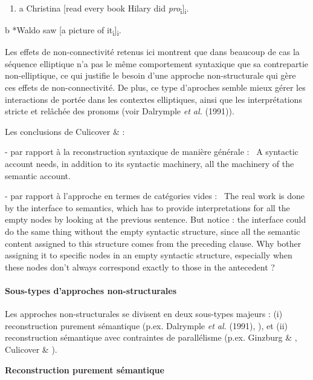 \begin{enumerate}
\item \label{bkm:Ref305966424}a  Christina [read every book Hilary did \textit{pro}\textsubscript{i}]\textsubscript{i}.


\end{enumerate}
  b  *Waldo saw [a picture of it\textsubscript{i}]\textsubscript{i}.

Les effets de non-connectivité retenus ici montrent que dans beaucoup de cas la séquence elliptique n'a pas le même comportement syntaxique que sa contrepartie non-elliptique, ce qui justifie le besoin d'une approche non-structurale qui gère ces effets de non-connectivité. De plus, ce type d'aproches semble mieux gérer les interactions de portée dans les contextes elliptiques, ainsi que les interprétations stricte et relâchée des pronoms (voir Dalrymple \textit{et al.} (1991)). 

Les conclusions de Culicover \& \citet{Jackendoff2005} :

- par rapport à la reconstruction syntaxique de manière générale : {\guillemotleft}~A syntactic account needs, in addition to its syntactic machinery, all the machinery of the semantic account.~{\guillemotright}

- par rapport à l'approche en termes de catégories vides : {\guillemotleft}~The real work is done by the interface to semantics, which has to provide interpretations for all the empty nodes by looking at the previous sentence. But notice : the interface could do the same thing without the empty syntactic structure, since all the semantic content assigned to this structure comes from the preceding clause. Why bother assigning it to specific nodes in an empty syntactic structure, especially when these nodes don't always correspond exactly to those in the antecedent ?~{\guillemotright}

\paragraph[Sous-types d'approches non-structurales]{Sous-types d'approches non-structurales}
Les approches non-structurales se divisent en deux sous-types majeurs : (i) reconstruction purement sémantique (p.ex. Dalrymple \textit{et al.} (1991), \citet{Dalrymple2005}), et (ii) reconstruction sémantique avec contraintes de parallélisme (p.ex. Ginzburg \& \citet{Sag2000}, Culicover \& \citet{Jackendoff2005}).

{\bfseries
Reconstruction purement sémantique}

